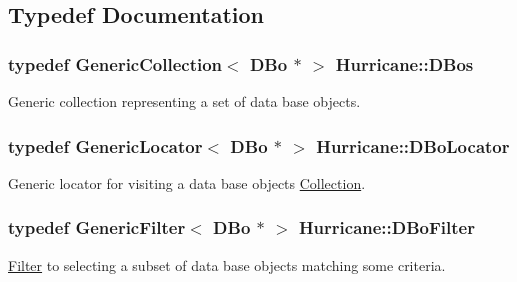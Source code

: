 \subsection{Typedef Documentation}
\hypertarget{namespaceHurricane_a0aa3882e095f9d425c253223d1c0793d}{
\subsubsection[{D\-Bos}]{\setlength{\rightskip}{0pt plus 5cm}typedef {\bf Generic\-Collection}$<$ {\bf D\-Bo} $\ast$ $>$ {\bf Hurricane\-::\-D\-Bos}}}\label{namespaceHurricane_a0aa3882e095f9d425c253223d1c0793d}
Generic collection representing a set of data base objects. \hypertarget{namespaceHurricane_a7d70ef7ad837859e453171feb692535c}{
\subsubsection[{D\-Bo\-Locator}]{\setlength{\rightskip}{0pt plus 5cm}typedef {\bf Generic\-Locator}$<$ {\bf D\-Bo} $\ast$ $>$ {\bf Hurricane\-::\-D\-Bo\-Locator}}}\label{namespaceHurricane_a7d70ef7ad837859e453171feb692535c}
Generic locator for visiting a data base objects \hyperlink{classHurricane_1_1Collection}{Collection}. \hypertarget{namespaceHurricane_a2af87173f0c45c5dc1f504d3ea2317d9}{
\subsubsection[{D\-Bo\-Filter}]{\setlength{\rightskip}{0pt plus 5cm}typedef {\bf Generic\-Filter}$<$ {\bf D\-Bo} $\ast$ $>$ {\bf Hurricane\-::\-D\-Bo\-Filter}}}\label{namespaceHurricane_a2af87173f0c45c5dc1f504d3ea2317d9}
\hyperlink{classHurricane_1_1Filter}{Filter} to selecting a subset of data base objects matching some criteria. \hypertarget{namespaceHurricane_a7b7200a36ab7ce8a157ddbe78b625f38}{
\subsubsection[{Layers}]{}}\label{namespaceHurricane_a7b7200a36ab7ce8a157ddbe78b625f38}
